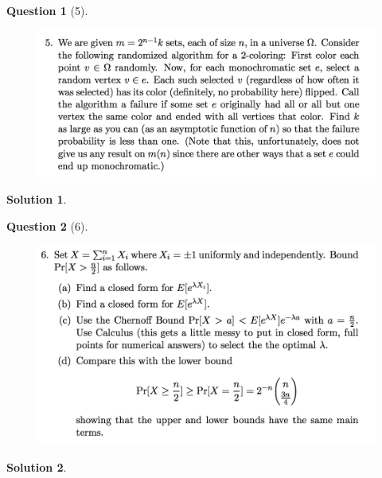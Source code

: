 \documentclass{article} %
\theoremstyle{quest}
\newtheorem*{question}{Question}
\newtheorem*{solution}{Solution}
\begin{document}
\newpage

\begin{question}[5]
\hfill
\begin{figure}[h!]
  \centering
    \includegraphics[width=1\textwidth]{PM-2-5.png}
\end{figure}
\end{question}
\begin{solution}
 
\end{solution}

\newpage

\begin{question}[6]
\hfill
\begin{figure}[h!]
  \centering
    \includegraphics[width=1\textwidth]{PM-2-6.png}
\end{figure}
\end{question}
\begin{solution}
 
\end{solution}
\end{document}
